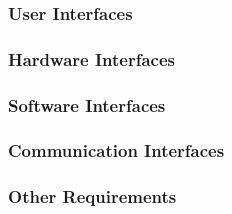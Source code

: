 \documentclass[draftclsnofoot, onecolumn, compsoc, 10pt]{IEEEtran}
\begin{document}
\subsubsection{User Interfaces}
\subsubsection{Hardware Interfaces}
\subsubsection{Software Interfaces}
\subsubsection{Communication Interfaces}
\subsubsection{Other Requirements} 
\end{document}
